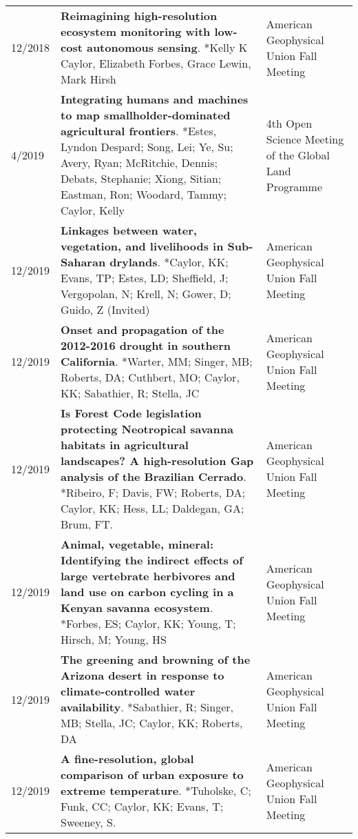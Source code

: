 \begin{longtable}{lp{10.0cm}p{4.5cm}}
12/2018 & {\bf Reimagining high-resolution ecosystem monitoring with low-cost autonomous sensing}. *Kelly K Caylor, Elizabeth Forbes, Grace Lewin, Mark Hirsh  & American Geophysical Union Fall Meeting \\
  
4/2019 & {\bf Integrating humans and machines to map smallholder-dominated agricultural frontiers}. *Estes, Lyndon Despard; Song, Lei; Ye, Su; Avery, Ryan; McRitchie, Dennis; Debats, Stephanie; Xiong, Sitian; Eastman, Ron; Woodard, Tammy; Caylor, Kelly  & 4th Open Science Meeting of the Global Land Programme \\
  
12/2019 & {\bf Linkages between water, vegetation, and livelihoods in Sub-Saharan drylands}. *Caylor, KK; Evans, TP; Estes, LD; Sheffield, J; Vergopolan, N; Krell, N;  Gower, D; Guido, Z  (Invited)  & American Geophysical Union Fall Meeting \\
  
12/2019 & {\bf Onset and propagation of the 2012-2016 drought in southern California}. *Warter, MM; Singer, MB; Roberts, DA; Cuthbert, MO; Caylor, KK; Sabathier, R; Stella, JC  & American Geophysical Union Fall Meeting \\
  
12/2019 & {\bf Is Forest Code legislation protecting Neotropical savanna habitats in agricultural landscapes? A high-resolution Gap analysis of the Brazilian Cerrado}. *Ribeiro, F; Davis, FW; Roberts, DA; Caylor, KK; Hess, LL; Daldegan, GA; Brum, FT.   & American Geophysical Union Fall Meeting \\
  
12/2019 & {\bf Animal, vegetable, mineral: Identifying the indirect effects of large vertebrate herbivores and land use on carbon cycling in a Kenyan savanna ecosystem}. *Forbes, ES; Caylor, KK; Young, T; Hirsch, M; Young, HS  & American Geophysical Union Fall Meeting \\
  
12/2019 & {\bf The greening and browning of the Arizona desert in response to climate-controlled water availability}. *Sabathier, R; Singer, MB; Stella, JC; Caylor, KK; Roberts, DA  & American Geophysical Union Fall Meeting \\
  
12/2019 & {\bf A fine-resolution, global comparison of urban exposure to extreme temperature}. *Tuholske, C; Funk, CC; Caylor, KK; Evans, T; Sweeney, S.  & American Geophysical Union Fall Meeting \\
  

\end{longtable}
